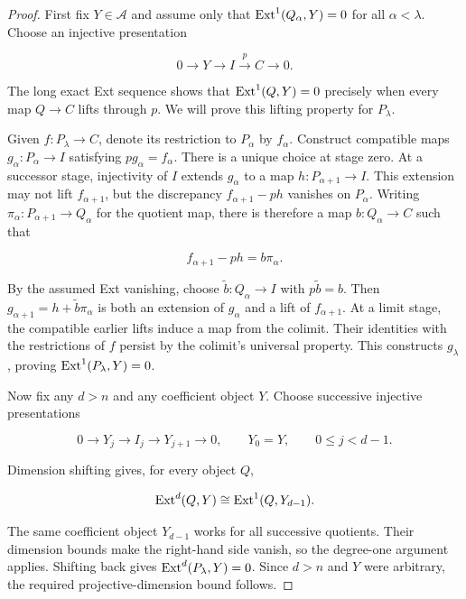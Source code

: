 \begin{proof}
First fix \(Y\in\mathcal A\) and assume only that
\(\operatorname{Ext}^1(Q_\alpha,Y)=0\) for all \(\alpha<\lambda\). Choose an injective
presentation

\[
0\longrightarrow Y\longrightarrow I\xrightarrow{p}C\longrightarrow0.
\]

The long exact Ext sequence shows that \(\operatorname{Ext}^1(Q,Y)=0\) precisely when
every map \(Q\to C\) lifts through \(p\). We will prove this lifting
property for \(P_\lambda\).

Given \(f:P_\lambda\to C\), denote its restriction to \(P_\alpha\) by
\(f_\alpha\). Construct compatible maps \(g_\alpha:P_\alpha\to I\)
satisfying \(p g_\alpha=f_\alpha\). There is a unique choice at stage zero.
At a successor stage, injectivity of \(I\) extends \(g_\alpha\) to a map
\(h:P_{\alpha+1}\to I\). This extension may not lift \(f_{\alpha+1}\),
but the discrepancy \(f_{\alpha+1}-ph\) vanishes on \(P_\alpha\).
Writing \(\pi_\alpha:P_{\alpha+1}\to Q_\alpha\) for the quotient map,
there is therefore a map \(b:Q_\alpha\to C\) such that

\[
f_{\alpha+1}-ph=b\pi_\alpha.
\]

By the assumed Ext vanishing, choose \(\widetilde b:Q_\alpha\to I\)
with \(p\widetilde b=b\). Then
\(g_{\alpha+1}=h+\widetilde b\pi_\alpha\) is both an extension of
\(g_\alpha\) and a lift of \(f_{\alpha+1}\). At a limit stage, the
compatible earlier lifts induce a map from the colimit. Their identities
with the restrictions of \(f\) persist by the colimit's universal property.
This constructs \(g_\lambda\), proving \(\operatorname{Ext}^1(P_\lambda,Y)=0\).

Now fix any \(d>n\) and any coefficient object \(Y\). Choose successive
injective presentations

\[
0\longrightarrow Y_j\longrightarrow I_j\longrightarrow Y_{j+1}
\longrightarrow0,
\qquad Y_0=Y,
\qquad 0\leq j<d-1.
\]

Dimension shifting gives, for every object \(Q\),

\[
\operatorname{Ext}^d(Q,Y)\cong\operatorname{Ext}^1(Q,Y_{d-1}).
\]

The same coefficient object \(Y_{d-1}\) works for all successive
quotients. Their dimension bounds make the right-hand side vanish, so the
degree-one argument applies. Shifting back gives
\(\operatorname{Ext}^d(P_\lambda,Y)=0\). Since \(d>n\) and \(Y\) were arbitrary,
the required projective-dimension bound follows.
\end{proof}

